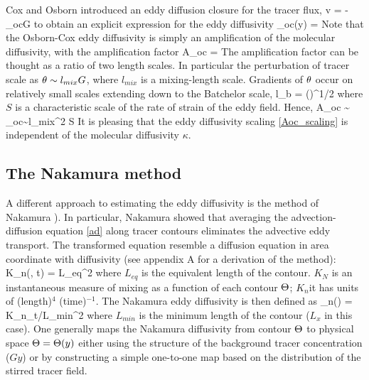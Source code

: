\documentclass[11pt]{article}
\newcommand{\kappaN}{\kappa_{n}}
\newcommand{\kappaoc}{\kappa_{oc}}
\begin{document}
Cox and Osborn introduced an eddy diffusion closure for the tracer flux,
\beq
\label{oc_diff}
\la v \vth \raxt = - \kappaoc G\com
\eeq
to obtain an explicit expression for the eddy diffusivity
\beq
\label{koc}
\kappaoc(y) =  \kappa\per
\eeq
Note that the Osborn-Cox eddy diffusivity is simply an amplification of the molecular diffusivity, with the amplification
factor
\beq
A_{oc} = \per
\eeq
The amplification factor can be thought as a ratio of two length scales. In particular the perturbation of tracer scale as
$\theta \sim l_{mix} G$, where $l_{mix}$ is a mixing-length scale. Gradients of $\theta$ occur on relatively small scales extending
down to the Batchelor scale,
\beq
l_b = \left(\right)^{1/2}\com
\eeq
where $S$ is a characteristic scale of the rate of strain of the eddy field. Hence,
\beq
\label{Aoc_scaling}
A_{oc} \sim {} \Longrightarrow \kappaoc \sim l_{mix}^2 S\per
\eeq
It is pleasing that the eddy diffusivity scaling \eqref{Aoc_scaling} is independent of the molecular diffusivity $\kappa$.

\subsection{The Nakamura method}

A different approach to estimating the eddy diffusivity is the method of Nakamura ). In particular, Nakamura showed that averaging the advection-diffusion equation \eqref{ad} along tracer contours eliminates the advective eddy transport. The transformed equation resemble a diffusion equation in area coordinate with diffusivity (see appendix A for a derivation of the method):
\beq
\label{kN}
K_{n}(\Th, t) = L_{eq}^2 \kappa\com
\eeq
where $L_{eq}$ is the equivalent length of the contour. $K_N$ is an instantaneous measure of mixing as a function of each contour $\Theta$; $K_n$it has units of (length)$^4$ (time)$^{-1}$. The Nakamura eddy diffusivity is then defined as
\beq
\kappaN(\Th) = \la K_n\ra_t/L_{min}^2\com
\eeq
where $L_{min}$ is the minimum length of the contour ($L_x$ in this case). One generally maps the Nakamura diffusivity from 
 contour $\Theta$ to physical space $\Theta = \Theta(y)$ either using the structure of the background tracer concentration ($G y$) or by constructing a simple one-to-one map based on the distribution of the stirred tracer field.
\end{document}
